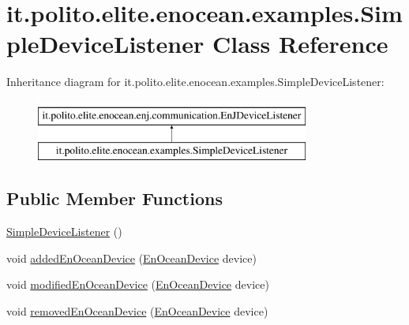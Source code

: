\hypertarget{classit_1_1polito_1_1elite_1_1enocean_1_1examples_1_1_simple_device_listener}{}\section{it.\+polito.\+elite.\+enocean.\+examples.\+Simple\+Device\+Listener Class Reference}
\label{classit_1_1polito_1_1elite_1_1enocean_1_1examples_1_1_simple_device_listener}
Inheritance diagram for it.\+polito.\+elite.\+enocean.\+examples.\+Simple\+Device\+Listener\+:\begin{figure}[H]
\begin{center}
\leavevmode
\includegraphics[height=2.000000cm]{classit_1_1polito_1_1elite_1_1enocean_1_1examples_1_1_simple_device_listener}
\end{center}
\end{figure}
\subsection*{Public Member Functions}
\begin{DoxyCompactItemize}
\item 
\hyperlink{classit_1_1polito_1_1elite_1_1enocean_1_1examples_1_1_simple_device_listener_ad5a91a9660c29981fbf33c77a4592439}{Simple\+Device\+Listener} ()
\item 
void \hyperlink{classit_1_1polito_1_1elite_1_1enocean_1_1examples_1_1_simple_device_listener_ac45863a003b12605520086f7d3e9b5d9}{added\+En\+Ocean\+Device} (\hyperlink{classit_1_1polito_1_1elite_1_1enocean_1_1enj_1_1model_1_1_en_ocean_device}{En\+Ocean\+Device} device)
\item 
void \hyperlink{classit_1_1polito_1_1elite_1_1enocean_1_1examples_1_1_simple_device_listener_af8ecaa5dd2d0fcb5907d939d7428eb5d}{modified\+En\+Ocean\+Device} (\hyperlink{classit_1_1polito_1_1elite_1_1enocean_1_1enj_1_1model_1_1_en_ocean_device}{En\+Ocean\+Device} device)
\item 
void \hyperlink{classit_1_1polito_1_1elite_1_1enocean_1_1examples_1_1_simple_device_listener_a7bc702e3f0f7175e052af6fddb39fe83}{removed\+En\+Ocean\+Device} (\hyperlink{classit_1_1polito_1_1elite_1_1enocean_1_1enj_1_1model_1_1_en_ocean_device}{En\+Ocean\+Device} device)
\end{DoxyCompactItemize}


